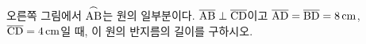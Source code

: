 \noindent\begin{minipage}[t]{0.58\linewidth}\vspace{0pt}\raggedright 오른쪽 그림에서 $\overset{\frown}{\mathrm{AB}}$는 원의 일부분이다. $\overline{\mathrm{AB}}\perp\overline{\mathrm{CD}}$이고 $\overline{\mathrm{AD}}=\overline{\mathrm{BD}}=8\,\mathrm{cm}$, $\overline{\mathrm{CD}}=4\,\mathrm{cm}$일 때, 이 원의 반지름의 길이를 구하시오.\end{minipage}\hfill\begin{minipage}[t]{0.4\linewidth}\vspace{0pt}\centering \resizebox{\ifdim\width>\linewidth\linewidth\else\width\fi}{!}{}\end{minipage}\par
